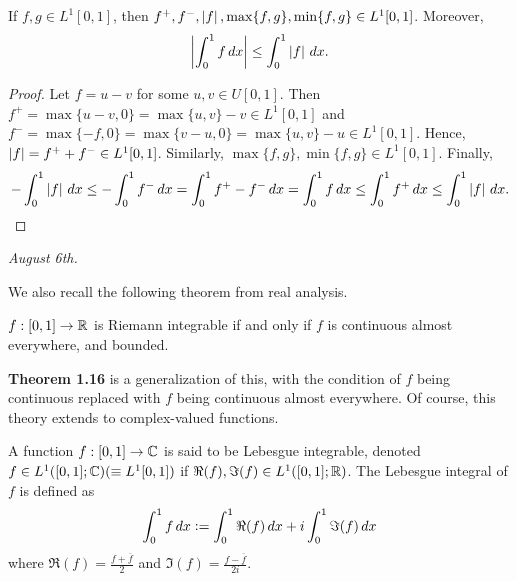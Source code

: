 \begin{theorem}
    If $f,g \in L^{1}[0,1]$, then $f^{+},f^{-},\left| f \right|,\max\{f,g\},\min\{f,g\} \in L^{1}[0,1]$. Moreover,
    \begin{align}
        \left| \int_{0}^{1} f \, dx \right| \leq \int_{0}^{1} \left| f \right| \, dx.
    \end{align}
\end{theorem}

\begin{proof}
    Let $f = u-v$ for some $u,v \in U[0,1]$. Then $f^{+} = \max\{u-v,0\} = \max\{u,v\}-v \in L^{1}[0,1]$ and $f^{-} = \max\{-f,0\} = \max\{v-u,0\} = \max\{u,v\}-u \in L^{1}[0,1]$. Hence, $\left| f \right| = f^{+}+f^{-} \in L^{1}[0,1]$. Similarly, $\max\{f,g\},\min\{f,g\} \in L^{1}[0,1]$. Finally,
    \begin{align}
        -\int_{0}^{1} \left| f \right| \, dx \leq -\int_{0}^{1} f^{-} \, dx = \int_{0}^{1} f^{+}-f^{-} \, dx = \int_{0}^{1} f \, dx \leq \int_{0}^{1} f^{+} \, dx \leq \int_{0}^{1} \left| f \right| \, dx.
    \end{align}
\end{proof}

\textit{August 6th.}

\noindent We also recall the following theorem from real analysis.

\begin{theorem}
    $f:[0,1] \to \mathbb{R}$ is Riemann integrable if and only if $f$ is continuous almost everywhere, and bounded.
\end{theorem}

\textbf{Theorem 1.16} is a generalization of this, with the condition of $f$ being continuous replaced with $f$ being continuous almost everywhere. Of course, this theory extends to complex-valued functions.

\begin{definition}
    A function $f:[0,1] \to \mathbb{C}$ is said to be Lebesgue integrable, denoted $f \in L^{1}([0,1];\mathbb{C}) (\equiv L^{1}[0,1])$ if $\Re(f),\Im(f) \in L^{1}([0,1];\mathbb{R})$. The Lebesgue integral of $f$ is defined as
    \begin{align}
        \int_{0}^{1} f \, dx \vcentcolon= \int_{0}^{1} \Re(f) \, dx + i\int_{0}^{1} \Im(f) \, dx
    \end{align}
    where $\Re(f) = \frac{f+\overline{f}}{2}$ and $\Im(f) = \frac{f-\overline{f}}{2i}$.
\end{definition}

